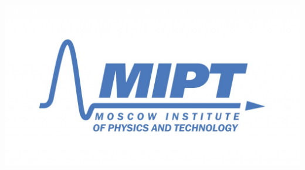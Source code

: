 \begin{titlepage}
\begin{bottompar}
	\begin{center}
		\includegraphics[width = 80 mm]{logo.jpg}
	\end{center}

\end{bottompar}
\vfill %

\end{titlepage}